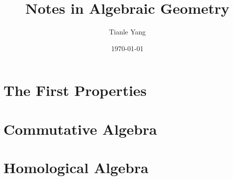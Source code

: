 \documentclass{notetobook}
\title{Notes in Algebraic Geometry}
\author{Tianle Yang}
\date{\today}
\begin{document}
    \pagestyle{empty}
    \maketitle

    \frontmatter

    \pagestyle{mainmatterstyle}

    \tableofcontents

    \mainmatter

    \chapter{The First Properties}
         

    \appendix

    \chapter{Commutative Algebra}
        
        
        
        
        

    \chapter{Homological Algebra}
        
        
        


    \printbibliography
    
\end{document}
